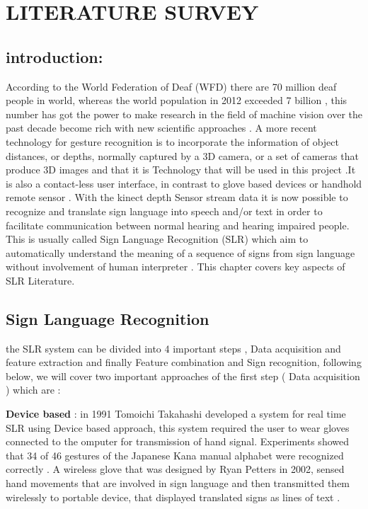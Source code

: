 

\chapter{LITERATURE SURVEY} \label{chapter1}

\section{introduction:} 

According to the World Federation of Deaf (WFD) \cite{wfd} there are 70 million deaf people in world, whereas the world population in 2012 exceeded 7 billion  , this number has got the power to make research in the field of machine vision  over  the  past  decade become rich with new scientific approaches .
A  more  recent   technology  for gesture   recognition  is to  incorporate   the  information   of object   distances,   or depths,   normally   captured   by a 3D camera,   or a set  of cameras  that  produce 3D images and that it is Technology that will be used in this project  .It is also a contact-less  user interface,   in contrast   to glove based   devices  or handhold  remote  sensor .
\newline
With the kinect depth Sensor stream data it is now possible to recognize and  translate sign language into speech and/or text in order to facilitate communication between normal hearing and hearing impaired people. This is usually called Sign Language Recognition (SLR) which  aim  to automatically understand the meaning of a sequence of signs from sign language without involvement of human interpreter \cite{27}. This chapter covers key aspects of SLR Literature.

\section{ Sign  Language Recognition}  

the SLR system can be divided into 4 important  steps , Data acquisition and feature extraction and finally Feature combination and Sign recognition, following below, we will cover two important approaches of the first step ( Data acquisition ) which are  :

\textbf{Device based }:
in  1991 Tomoichi Takahashi   developed a system for real time SLR  using Device based approach, this system required the user to wear gloves connected to the omputer for transmission of hand signal. Experiments showed that 34 of 46 gestures of the Japanese Kana manual alphabet were recognized correctly \cite{29}
.
A wireless glove that was designed by Ryan Petters  \cite{31}in 2002, sensed hand movements that are involved in sign language and then transmitted them wirelessly to portable device, that displayed translated signs as lines of text .
 

